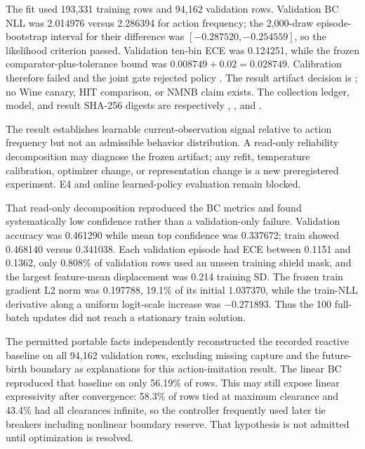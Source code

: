 \documentclass[11pt]{article}
\begin{document}
The fit used 193,331 training rows and 94,162 validation rows.  Validation BC
NLL was 2.014976 versus 2.286394 for action frequency; the 2,000-draw
episode-bootstrap interval for their difference was
$[-0.287520,-0.254559]$, so the likelihood criterion passed.  Validation
ten-bin ECE was 0.124251, while the frozen comparator-plus-tolerance bound was
$0.008749+0.02=0.028749$.  Calibration therefore failed and the joint gate
rejected policy .  The result
artifact decision is ; no Wine canary, HIT
comparison, or NMNB claim exists.  The collection ledger, model, and result
SHA-256 digests are respectively
,
,
and
.

The result establishes learnable current-observation signal relative to action
frequency but not an admissible behavior distribution.  A read-only
reliability decomposition may diagnose the frozen artifact; any refit,
temperature calibration, optimizer change, or representation change is a new
preregistered experiment.  E4 and online learned-policy evaluation remain
blocked.

That read-only decomposition reproduced the BC metrics and found systematically
low confidence rather than a validation-only failure.  Validation accuracy was
0.461290 while mean top confidence was 0.337672; train showed 0.468140 versus
0.341038.  Each validation episode had ECE between 0.1151 and 0.1362, only
0.808\% of validation rows used an unseen training shield mask, and the largest
feature-mean displacement was 0.214 training SD.  The frozen
train gradient L2 norm was 0.197788, 19.1\% of its initial 1.037370, while the
train-NLL derivative along a uniform logit-scale increase was $-0.271893$.
Thus the 100 full-batch updates did not reach a stationary train solution.

The permitted portable facts independently reconstructed the recorded reactive
baseline on all 94,162 validation rows, excluding missing capture and the
future-birth boundary as explanations for this action-imitation result.  The
linear BC reproduced that baseline on only 56.19\% of rows.  This may still
expose linear expressivity after convergence: 58.3\% of rows tied at maximum
clearance and 43.4\% had all clearances infinite, so the controller frequently
used later tie breakers including nonlinear boundary reserve.  That hypothesis
is not admitted until optimization is resolved.
\end{document}

